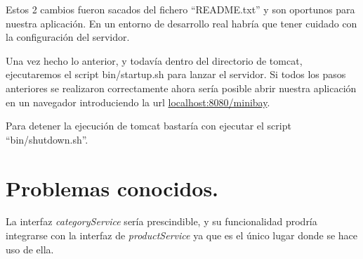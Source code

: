 \documentclass[12pt,a4paper,twoside,spanish]{article}      %
\begin{document}
Estos 2 cambios fueron sacados del fichero ``README.txt'' y son oportunos para nuestra aplicación. En un entorno de desarrollo real habría que tener cuidado con la configuración del servidor.

Una vez hecho lo anterior, y todavía dentro del directorio de tomcat, ejecutaremos el script bin/startup.sh para lanzar el servidor. Si todos los pasos anteriores se realizaron correctamente ahora sería posible abrir nuestra aplicación en un navegador introduciendo la url \url{localhost:8080/minibay}.

Para detener la ejecución de tomcat bastaría con ejecutar el script ``bin/shutdown.sh''.

\section{Problemas conocidos.}
La interfaz \textit{categoryService} sería prescindible, y su funcionalidad prodría integrarse con la interfaz de  \textit{productService} ya que es el único lugar donde se hace uso de ella.


\end{document}
